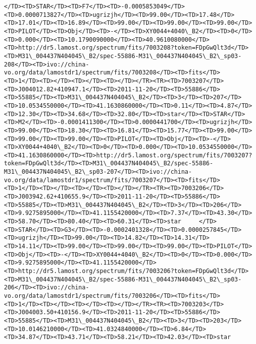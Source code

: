 \documentclass[11pt]{article}
\begin{document}
\begin{Verbatim}[commandchars=\\\{\}]
</TD><TD>STAR</TD><TD>F7</TD><TD>-0.0005853049</TD><TD>0.0000713827</TD><TD>ugrizjh</TD><TD>99.00</TD><TD>17.48</TD><TD>17.01</TD><TD>16.89</TD><TD>99.00</TD><TD>99.00</TD><TD>99.00</TD><TD>PILOT</TD><TD>Obj</TD><TD>-</TD><TD>XY0044+4040\_B2</TD><TD>0</TD><TD>0.000</TD><TD>10.1790090000</TD><TD>40.9610080000</TD><TD>http://dr5.lamost.org/spectrum/fits/7003208?token=FDpGwQlt3d</TD><TD>M31\_004437N404045\_B2/spec-55886-M31\_004437N404045\_B2\_sp03-208</TD><TD>ivo://china-vo.org/data/lamostdr1/spectrum/fits/7003208</TD><TD>fits</TD><TD>1</TD><TD></TD><TD></TD><TD></TD></TR><TR><TD>7003207</TD><TD>J004012.82+410947.1</TD><TD>2011-11-20</TD><TD>55886</TD><TD>55885</TD><TD>M31\_004437N404045\_B2</TD><TD>3</TD><TD>207</TD><TD>10.0534550000</TD><TD>41.1630860000</TD><TD>0.11</TD><TD>4.87</TD><TD>12.30</TD><TD>34.68</TD><TD>32.80</TD><TD>star</TD><TD>STAR</TD><TD>M2</TD><TD>-0.0001411300</TD><TD>0.0000441700</TD><TD>ugrizjh</TD><TD>99.00</TD><TD>18.30</TD><TD>16.81</TD><TD>15.77</TD><TD>99.00</TD><TD>99.00</TD><TD>99.00</TD><TD>PILOT</TD><TD>Obj</TD><TD>-</TD><TD>XY0044+4040\_B2</TD><TD>0</TD><TD>0.000</TD><TD>10.0534550000</TD><TD>41.1630860000</TD><TD>http://dr5.lamost.org/spectrum/fits/7003207?token=FDpGwQlt3d</TD><TD>M31\_004437N404045\_B2/spec-55886-M31\_004437N404045\_B2\_sp03-207</TD><TD>ivo://china-vo.org/data/lamostdr1/spectrum/fits/7003207</TD><TD>fits</TD><TD>1</TD><TD></TD><TD></TD><TD></TD></TR><TR><TD>7003206</TD><TD>J003942.62+410655.9</TD><TD>2011-11-20</TD><TD>55886</TD><TD>55885</TD><TD>M31\_004437N404045\_B2</TD><TD>3</TD><TD>206</TD><TD>9.9275895000</TD><TD>41.1155420000</TD><TD>7.37</TD><TD>43.30</TD><TD>58.70</TD><TD>80.40</TD><TD>60.31</TD><TD>star     </TD><TD>STAR</TD><TD>G3</TD><TD>-0.0002401328</TD><TD>0.0000257845</TD><TD>ugrizjh</TD><TD>99.00</TD><TD>14.82</TD><TD>14.31</TD><TD>14.11</TD><TD>99.00</TD><TD>99.00</TD><TD>99.00</TD><TD>PILOT</TD><TD>Obj</TD><TD>-</TD><TD>XY0044+4040\_B2</TD><TD>0</TD><TD>0.000</TD><TD>9.9275895000</TD><TD>41.1155420000</TD><TD>http://dr5.lamost.org/spectrum/fits/7003206?token=FDpGwQlt3d</TD><TD>M31\_004437N404045\_B2/spec-55886-M31\_004437N404045\_B2\_sp03-206</TD><TD>ivo://china-vo.org/data/lamostdr1/spectrum/fits/7003206</TD><TD>fits</TD><TD>1</TD><TD></TD><TD></TD><TD></TD></TR><TR><TD>7003203</TD><TD>J004003.50+410156.9</TD><TD>2011-11-20</TD><TD>55886</TD><TD>55885</TD><TD>M31\_004437N404045\_B2</TD><TD>3</TD><TD>203</TD><TD>10.0146210000</TD><TD>41.0324840000</TD><TD>6.84</TD><TD>34.87</TD><TD>43.71</TD><TD>58.21</TD><TD>42.03</TD><TD>star     
\end{Verbatim}
\end{document}
